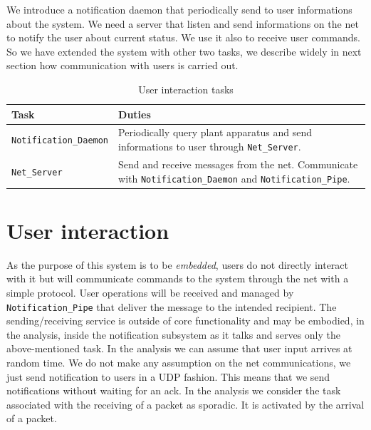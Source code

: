 \documentclass[10pt,a4paper]{report}
\begin{document}
We introduce a notification daemon that periodically  send to user 
informations about the system. We need a server that listen and send informations
on the net to notify the user about current status. We use it also to 
receive user commands. So we have extended the system with other two tasks, we 
describe widely in next section how communication with users is carried out.

\begin{table}[htb]
\centering
\begin{tabular}{|l p{7cm}|}
\hline 
\textbf{Task} & \textbf{Duties} \\
\hline \hline
\texttt{Notification\_Daemon} & Periodically query plant apparatus and send 
    informations to user through \texttt{Net\_Server}. \\
\texttt{Net\_Server} & Send and receive messages from the net. Communicate with
    \texttt{Notification\_Daemon} and \texttt{Notification\_Pipe}.\\
\hline
\end{tabular}
\caption{User interaction tasks}
\end{table}

\section{User interaction}
As the purpose of this system is to be \emph{embedded}, users do not 
directly interact with it but will communicate commands to the system 
through the net with a simple protocol. User operations will be received and
managed by \texttt{Notification\_Pipe} that deliver the message to the 
intended recipient. The sending/receiving service is outside of core functionality 
and may be embodied, in the analysis, inside the notification subsystem as it talks 
and serves only the above-mentioned task. In the analysis we can assume that 
user input arrives at random time. We do not make any assumption on the net
communications, we just send notification to users in a UDP fashion. This
means that we send notifications without waiting for an ack. In the analysis we 
consider the task associated with the receiving of a packet as sporadic. It is 
activated by the arrival of a packet. 
\end{document}
